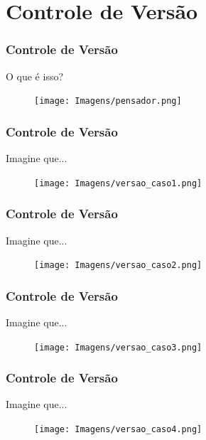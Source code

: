 \documentclass[10pt]{beamer} %
\begin{document}
\section{Controle de Versão}

\begin{frame}
\frametitle{Controle de Versão}
\transboxin

\begin{block}{O que é isso?}
\begin{figure}[H]
\centering
\texttt{[image: Imagens/pensador.png]}
\end{figure}
\end{block}

\end{frame}

\begin{frame}
\frametitle{Controle de Versão}
\transboxin

\begin{block}{Imagine que...}
\begin{figure}[H]
\centering
\texttt{[image: Imagens/versao\_caso1.png]}
\end{figure}

\end{block}
\end{frame}

\begin{frame}
\frametitle{Controle de Versão}


\begin{block}{Imagine que...}
\begin{figure}[H]
\centering
\texttt{[image: Imagens/versao\_caso2.png]}
\end{figure}

\end{block}
\end{frame}

\begin{frame}
\frametitle{Controle de Versão}


\begin{block}{Imagine que...}
\begin{figure}[H]
\centering
\texttt{[image: Imagens/versao\_caso3.png]}
\end{figure}

\end{block}
\end{frame}

\begin{frame}
\frametitle{Controle de Versão}


\begin{block}{Imagine que...}
\begin{figure}[H]
\centering
\texttt{[image: Imagens/versao\_caso4.png]}
\end{figure}

\end{block}
\end{frame}
\end{document}
